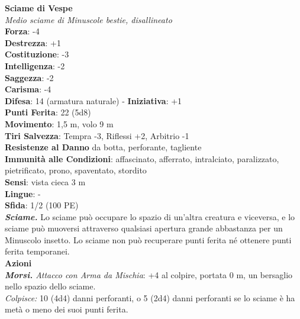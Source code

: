 \begin{multicols}{2}
\medskip\textbf{Sciame di Vespe}\\
\emph{Medio sciame di Minuscole bestie, disallineato}\\
\textbf{Forza}: -4\\
\textbf{Destrezza}: +1\\
\textbf{Costituzione}: -3\\
\textbf{Intelligenza}: -2\\
\textbf{Saggezza}: -2\\
\textbf{Carisma}: -4\\
\textbf{Difesa}: 14 (armatura naturale) - \textbf{Iniziativa}: +1\\
\textbf{Punti Ferita}: 22 (5d8)\\
\textbf{Movimento}: 1,5 m, volo 9 m\\
\textbf{Tiri Salvezza}: Tempra -3, Riflessi +2, Arbitrio -1\\
\textbf{Resistenze al Danno} da botta, perforante, tagliente\\
\textbf{Immunità alle Condizioni}: affascinato, afferrato, intralciato, paralizzato, pietrificato, prono, spaventato, stordito\\
\textbf{Sensi}: vista cieca 3 m\\
\textbf{Lingue}: -\\
\textbf{Sfida}: 1/2 (100 PE)\smallskip\\
\emph{\textbf{Sciame.}} Lo sciame può occupare lo spazio di un'altra creatura e viceversa, e lo sciame può muoversi attraverso qualsiasi apertura grande abbastanza per un Minuscolo insetto. Lo sciame non può recuperare punti ferita né ottenere punti ferita temporanei.\\
\smallskip\textbf{Azioni}\\
\emph{\textbf{Morsi.} Attacco con Arma da Mischia}: +4 al colpire, portata 0 m, un bersaglio nello spazio dello sciame.\\
\emph{Colpisce:} 10 (4d4) danni perforanti, o 5 (2d4) danni perforanti se lo sciame è ha metà o meno dei suoi punti ferita.\\


\end{multicols}
